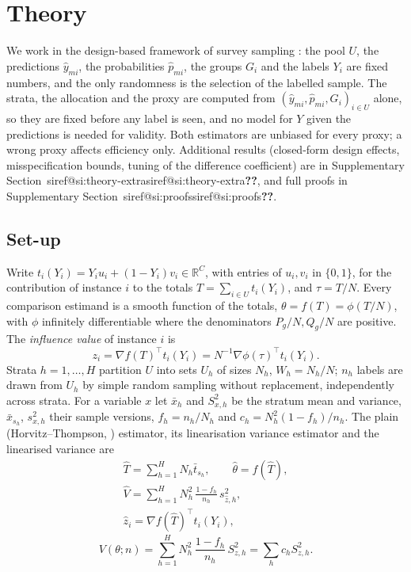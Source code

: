 \documentclass[pdflatex,sn-mathphys-num,iicol]{sn-jnl}
\makeatletter
\theoremstyle{thmstyleone}
\theoremstyle{thmstyletwo}
\theoremstyle{thmstylethree}
\newcommand{\SIref}[1]{\ifcsname siref@#1\endcsname\csname siref@#1\endcsname\else\textbf{??}\fi}
\makeatother
\begin{document}
\section{Theory}\label{sec:theory}

We work in the design-based framework of survey sampling \citep{cochran1977,sarndal1992}: the pool $U$,
the predictions $\hat y_{mi}$, the probabilities $\hat p_{mi}$, the groups $G_i$ and the labels $Y_i$ are fixed
numbers, and the only randomness is the selection of the labelled sample. The strata, the allocation and
the proxy are computed from $(\hat y_{mi},\hat p_{mi},G_i)_{i\in U}$ alone, so they are fixed before any label is seen,
and no model for $Y$ given the predictions is needed for validity. Both estimators are unbiased for every proxy; a wrong
proxy affects efficiency only. Additional results (closed-form design effects, misspecification bounds,
tuning of the difference coefficient) are in Supplementary Section~\SIref{si:theory-extra}, and full proofs in
Supplementary Section~\SIref{si:proofs}.

\subsection{Set-up}\label{sec:theory-setup}

Write $t_i(Y_i)=Y_iu_i+(1-Y_i)v_i\in\mathbb{R}^C$, with entries of $u_i,v_i$ in $\{0,1\}$, for the contribution of instance $i$
to the totals $T=\sum_{i\in U}t_i(Y_i)$, and $\tau=T/N$. Every comparison estimand is a smooth function of the totals,
$\theta=f(T)=\phi(T/N)$, with $\phi$ infinitely differentiable where the denominators $P_g/N,Q_g/N$ are positive. The
\emph{influence value} of instance $i$ is
\begin{equation}\label{eq:influence}
z_i=\nabla f(T)^{\top}t_i(Y_i)=N^{-1}\nabla\phi(\tau)^{\top}t_i(Y_i).
\end{equation}
Strata $h=1,\dots,H$ partition $U$ into sets $U_h$ of sizes $N_h$, $W_h=N_h/N$; $n_h$ labels
are drawn from $U_h$ by simple random sampling without replacement, independently across strata.
For a variable $x$ let $\bar x_h$ and $S^2_{x,h}$ be the stratum mean and variance, $\bar x_{s_h}$, $s^2_{x,h}$
their sample versions, $f_h=n_h/N_h$ and $c_h=N_h^2(1-f_h)/n_h$. The plain
(Horvitz--Thompson, \citealt{horvitz1952}) estimator, its linearisation variance estimator
\citep[Ch.~5]{sarndal1992} and the linearised variance are
\begin{equation}\label{eq:ht}
\begin{gathered}
\hat T=\sum_{h=1}^HN_h\bar t_{s_h},\qquad \hat\theta=f(\hat T),\\
\hat V=\sum_{h=1}^H N_h^2\,\frac{1-f_h}{n_h}\,s^2_{\hat z,h},\\
\hat z_i=\nabla f(\hat T)^{\top}t_i(Y_i),
\end{gathered}
\end{equation}
\begin{equation}\label{eq:linvar}
V(\theta;n)=\sum_{h=1}^HN_h^2\,\frac{1-f_h}{n_h}\,S^2_{z,h}=\sum_hc_hS^2_{z,h}.
\end{equation}
\end{document}
